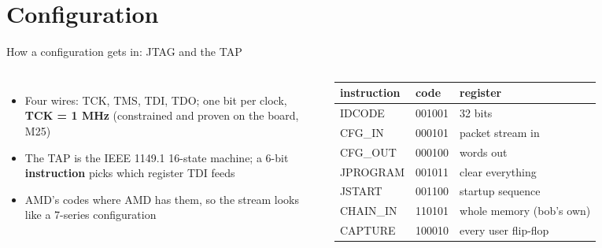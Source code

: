 \documentclass[aspectratio=169,11pt]{beamer}
\begin{document}
\section{Configuration}
\begin{frame}{How a configuration gets in: JTAG and the TAP}
  \begin{columns}[c]
    \small
    \begin{itemize}
      \item Four wires: TCK, TMS, TDI, TDO; one bit per clock, \textbf{TCK = 1 MHz} (constrained and proven on the board, M25)
      \item The TAP is the IEEE 1149.1 16-state machine; a 6-bit \textbf{instruction} picks which register TDI feeds
      \item AMD's codes where AMD has them, so the stream looks like a 7-series configuration
    \end{itemize}
    \scriptsize
    \begin{tabular}{@{}lll@{}}
      \toprule
      instruction & code & register \\
      \midrule
      IDCODE & 001001 & 32 bits \\
      CFG\_IN & 000101 & packet stream in \\
      CFG\_OUT & 000100 & words out \\
      JPROGRAM & 001011 & clear everything \\
      JSTART & 001100 & startup sequence \\
      CHAIN\_IN & 110101 & whole memory (bob's own) \\
      CAPTURE & 100010 & every user flip-flop \\
      \bottomrule
    \end{tabular}
  \end{columns}
\end{frame}
\end{document}

